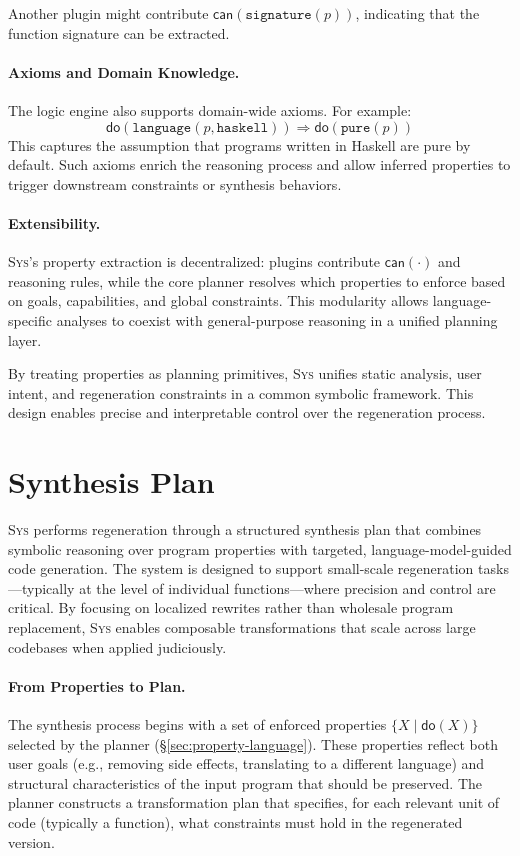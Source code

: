 \documentclass[sigplan]{acmart}
\newcommand{\sys}{{\scshape Sys}\xspace}
\begin{document}
Another plugin might contribute $\mathsf{can}(\texttt{signature}(p))$, indicating that the function signature can be extracted.

\paragraph{Axioms and Domain Knowledge.}
The logic engine also supports domain-wide axioms. For example:
\[
\mathsf{do}(\texttt{language}(p, \texttt{haskell})) \Rightarrow \mathsf{do}(\texttt{pure}(p))
\]
This captures the assumption that programs written in Haskell are pure by default. Such axioms enrich the reasoning process and allow inferred properties to trigger downstream constraints or synthesis behaviors.

\paragraph{Extensibility.}
\sys’s property extraction is decentralized: plugins contribute $\mathsf{can}(\cdot)$ and reasoning rules, while the core planner resolves which properties to enforce based on goals, capabilities, and global constraints. This modularity allows language-specific analyses to coexist with general-purpose reasoning in a unified planning layer.

By treating properties as planning primitives, \sys unifies static analysis, user intent, and regeneration constraints in a common symbolic framework. This design enables precise and interpretable control over the regeneration process.

\section{Synthesis Plan}

\sys performs regeneration through a structured synthesis plan that combines symbolic reasoning over program properties with targeted, language-model-guided code generation. The system is designed to support small-scale regeneration tasks—typically at the level of individual functions—where precision and control are critical. By focusing on localized rewrites rather than wholesale program replacement, \sys enables composable transformations that scale across large codebases when applied judiciously.

\paragraph{From Properties to Plan.}
The synthesis process begins with a set of enforced properties $\{ X \mid \mathsf{do}(X) \}$ selected by the planner (§\ref{sec:property-language}). These properties reflect both user goals (e.g., removing side effects, translating to a different language) and structural characteristics of the input program that should be preserved. The planner constructs a transformation plan that specifies, for each relevant unit of code (typically a function), what constraints must hold in the regenerated version.
\end{document}
